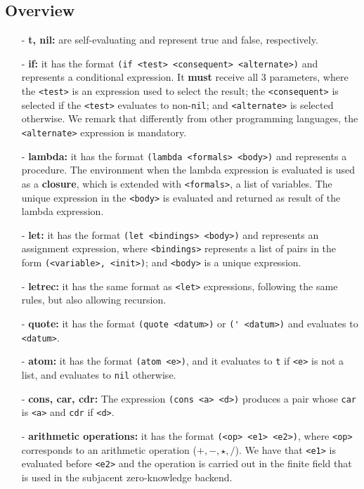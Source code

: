 \documentclass[10pt, english]{article}
\begin{document}

\subsection{Overview}

\begin{itemize}
  \item[-] \textbf{t, nil:} are self-evaluating and represent true and false, respectively.
  \item[-] \textbf{if:} it has the format \verb|(if <test> <consequent> <alternate>)| and represents a conditional expression. It \textbf{must} receive all 3 parameters, where the \verb|<test>| is an expression used to select the result; the \verb|<consequent>| is selected if the \verb|<test>| evaluates to non-\verb|nil|; and \verb|<alternate>| is selected otherwise. We remark that differently from other programming languages, the \verb|<alternate>| expression is mandatory.
  \item[-] \textbf{lambda:} it has the format \verb|(lambda <formals> <body>)| and represents a procedure. The environment when the lambda expression is evaluated is used as a \textbf{closure}, which is extended with \verb|<formals>|, a list of variables. The unique expression in the \verb|<body>| is evaluated and returned as result of the lambda expression.
  \item[-] \textbf{let:} it has the format \verb|(let <bindings> <body>)| and represents an assignment expression, where \verb|<bindings>| represents a list of pairs in the form \verb|(<variable>, <init>)|; and \verb|<body>| is a unique expression.
  \item[-] \textbf{letrec:} it has the same format as \verb|<let>| expressions, following the same rules, but also allowing recursion.
  \item[-] \textbf{quote:} it has the format \verb|(quote <datum>)| or \verb|(' <datum>)| and evaluates to \verb|<datum>|.
  \item[-] \textbf{atom:} it has the format \verb|(atom <e>)|, and it evaluates to \verb|t| if \verb|<e>| is not a list, and evaluates to \verb|nil| otherwise.
  \item[-] \textbf{cons, car, cdr:} The expression \verb|(cons <a> <d>)| produces a pair whose \verb|car| is \verb|<a>| and \verb|cdr| if \verb|<d>|.
  \item[-] \textbf{arithmetic operations:} it has the format \verb|(<op> <e1> <e2>)|, where \verb|<op>| corresponds to an arithmetic operation ($+, -, \star, \slash$). We have that \verb|<e1>| is evaluated before \verb|<e2>| and the operation is carried out in the finite field that is used in the subjacent zero-knowledge backend.

\end{itemize}
\end{document}
